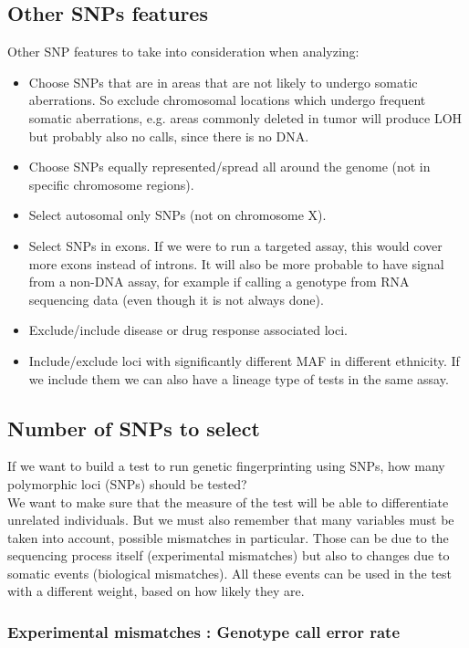 \subsection{Other SNPs features}
Other SNP features to take into consideration when analyzing:
\begin{itemize}
	\item Choose SNPs that are in areas that are not likely to undergo somatic aberrations. So exclude chromosomal locations which undergo frequent somatic aberrations, e.g. areas commonly deleted in tumor will produce LOH but probably also no calls, since there is no DNA.
	\item Choose SNPs equally represented/spread all around the genome (not in specific chromosome regions).
	\item Select autosomal only SNPs (not on chromosome X).
	\item Select SNPs in exons. If we were to run a targeted assay, this would cover more exons instead of introns. It will also be more probable to have signal from a non-DNA assay, for example if calling a genotype from RNA sequencing data (even though it is not always done).
	\item Exclude/include disease or drug response associated loci.
	\item Include/exclude loci with significantly different MAF in different ethnicity. If we include them we can also have a lineage type of tests in the same assay.
\end{itemize}


\subsection{Number of SNPs to select}

If we want to build a test to run genetic fingerprinting using SNPs, how many polymorphic loci (SNPs) should be tested?\\
We want to make sure that the measure of the test will be able to differentiate unrelated individuals.
But we must also remember that many variables must be taken into account, possible mismatches in particular. Those can be due to the sequencing process itself (experimental mismatches) but also to changes due to somatic events (biological mismatches). All these events can be used in the test with a different weight, based on how likely they are.


\subsubsection{Experimental mismatches : Genotype call error rate}

